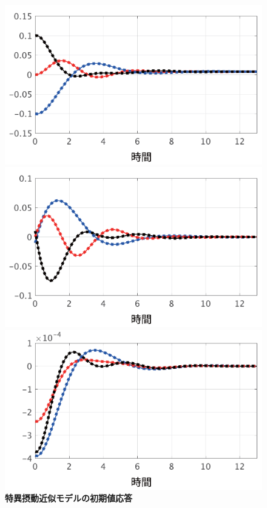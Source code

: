 \documentclass[tombow,dvipdfmx]{corona-a5-1.1}
\begin{document}
\begin{figure}[t]
  \centering
  {
  \begin{minipage}{0.49\linewidth}
    \centering
    \includegraphics[width = 1.0\linewidth]{figs/deltasp}
    \medskip
  \end{minipage}
  \begin{minipage}{0.49\linewidth}
    \centering
    \includegraphics[width = 1.0\linewidth]{figs/omegasp}
    \medskip
  \end{minipage}
    \centering
    \includegraphics[width = .49\linewidth]{figs/Esp}
  }
  \medskip
  \caption{\textbf{特異摂動近似モデルの初期値応答}}
  \label{fig:timeexsp}
\medskip
\end{figure}
\end{document}
